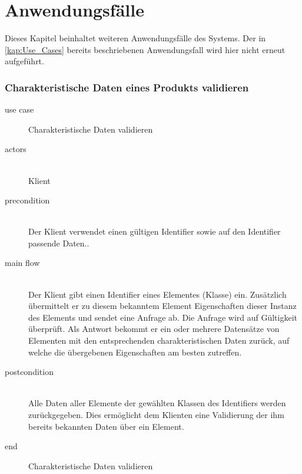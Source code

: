 \chapter{Anwendungsfälle}\label{kap:analyse_use_cases}

Dieses Kapitel beinhaltet weiteren Anwendungsfälle des Systems. Der in \autoref{kap:Use_Cases} bereits beschriebenen Anwendungsfall wird hier nicht erneut aufgeführt.  

\subsection{Charakteristische Daten eines Produkts validieren}

{\small

\begin{description}
     \item[use case] Charakteristische Daten validieren
     \item[  actors]~\\
     Klient
     \item[  precondition]~\\
     Der Klient verwendet einen gültigen Identifier sowie auf den Identifier passende Daten..
     \item[  main flow]~\\
     Der Klient gibt einen Identifier eines Elementes (Klasse) ein. Zusätzlich übermittelt er zu diesem bekanntem Element Eigenschaften dieser Instanz des Elements und sendet eine Anfrage ab. Die Anfrage wird auf Gültigkeit überprüft. Als Antwort bekommt er ein oder mehrere Datensätze von Elementen mit den entsprechenden charakteristischen Daten zurück, auf welche die übergebenen Eigenschaften am besten zutreffen. 
     \item[  postcondition]~\\
     Alle Daten aller Elemente der gewählten Klassen des Identifiers werden zurückgegeben. Dies ermöglicht dem Klienten eine Validierung der ihm bereits bekannten Daten über ein Element. 
     \item[end] Charakteristische Daten validieren
\end{description}

~\\

} %

